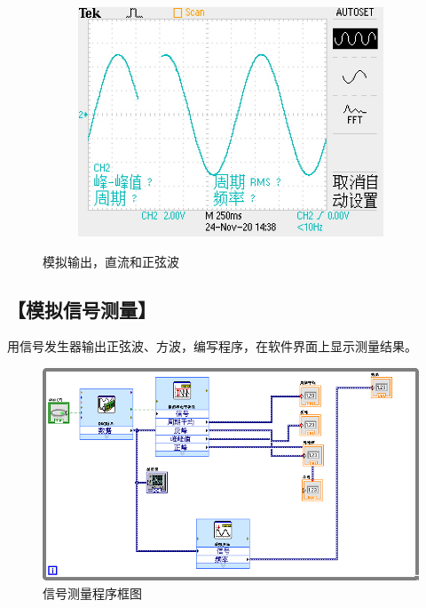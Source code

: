 \documentclass{ctexart}
\let\oldsubsection\subsection
\renewcommand{\subsection}[1]{\oldsubsection{\!\!\!\!\!\!【#1】}}
\begin{document}
\begin{figure}[H]
\begin{subfigure}{0.54\linewidth}
  \end{subfigure}
  \begin{subfigure}{0.41\linewidth}
    \includegraphics[width=\linewidth]{LabVIEW使用基础/信号测量系统测试/模拟输出/正弦波/示波器.JPG}
  \end{subfigure}
  \caption{模拟输出，直流和正弦波}
\end{figure}

\subsection{模拟信号测量}

用信号发生器输出正弦波、方波，编写程序，在软件界面上显示测量结果。

\begin{figure}[H]
  \centering
  \includegraphics[width=0.98\linewidth]{LabVIEW使用基础/模拟信号测量/程序.PNG}
  \caption{信号测量程序框图}
\end{figure}
\end{document}
